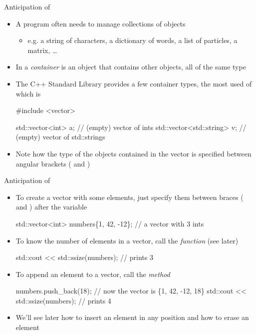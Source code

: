 \begin{frame}[fragile]{Anticipation of }
  
  \begin{itemize}
  \item A program often needs to manage collections of objects
    \begin{itemize}
    \item e.g. a string of characters, a dictionary of words, a list of
      particles, a matrix, \ldots
    \end{itemize}
  \item<2-> In \Cpp{} a \textit{container} is an object that contains other
    objects, all of the same type
  \item<3-> The C++ Standard Library provides a few container types, the most
    used of which is 

    \begin{codeblock}{
#include <vector>

std::vector<int> a;         // (empty) vector of int\textquotesingle{}s
std::vector<std::string> v; // (empty) vector of std::string\textquotesingle{}s}\end{codeblock}

  \item<3-> Note how the type of the objects contained in the vector is
    specified between angular brackets (\code{<} and \code{>})
  \end{itemize}

\end{frame}

\begin{frame}[fragile]{Anticipation of  \insertcontinuationtext}

  \begin{itemize}

  \item To create a vector with some elements, just specify them between braces
    (\code{\{} and \code{\}}) after the variable
    \begin{codeblock}
std::vector<int> numbers\{1, 42, -12\}; // a vector with 3 int\textquotesingle{}s\end{codeblock}

  \item<2-> To know the number of elements in a vector, call the 
    \textit{function} (see later)
    \begin{codeblock}
std::cout << std::ssize(numbers); // prints 3\end{codeblock}

  \item<3-> To append an element to a vector, call the  \textit{method}
    \begin{codeblock}
numbers.push_back(18);            // now the vector is \{1, 42, -12, 18\}
std::cout << std::ssize(numbers); // prints 4\end{codeblock}

  \item<4-> We'll see later how to insert an element in any position and how to
    erase an element
  \end{itemize}
\end{frame}

